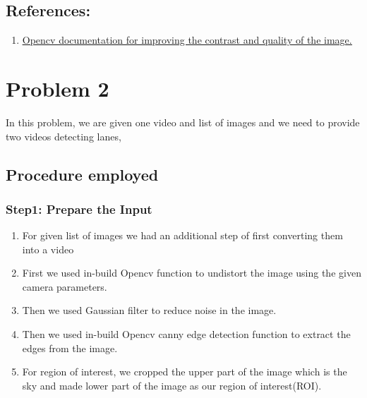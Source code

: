 \documentclass[12pt]{article}
\begin{document}
\subsection{References:}
\begin{enumerate}
\item \href{https://docs.opencv.org/3.4/d3/dc1/tutorial_basic_linear_transform.html}{\underline{Opencv documentation for improving the contrast and quality of the image.}}
\end{enumerate}

\section{Problem 2}
In this problem, we are given one video and list of images and we need to provide two videos detecting lanes,

\subsection{Procedure employed}
\subsubsection{Step1: Prepare the Input}
\begin{enumerate}
\item For given list of images we had an additional step of first converting them into a video

\item First we used in-build Opencv function to undistort the image using the given camera parameters.

\item Then we used Gaussian filter to reduce noise in the image.

\item Then we used in-build Opencv canny edge detection function to extract the edges from the image.

\item For region of interest, we cropped the upper part of the image which is the sky and made lower part of the image as  our region of interest(ROI).
\end{enumerate}
\end{document}
